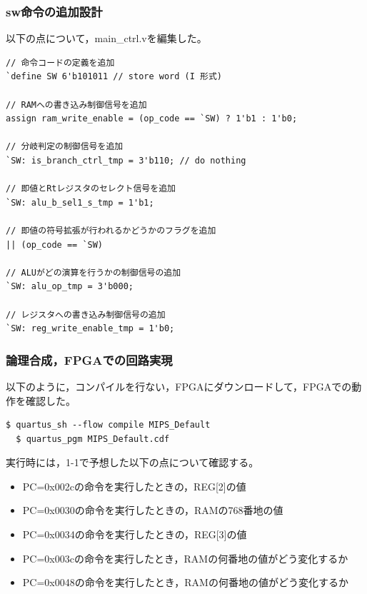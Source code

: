 \subsubsection{sw命令の追加設計}
以下の点について，main\_ctrl.vを編集した。
\begin{lstlisting}[caption={sw命令の追加設計},label={sw命令の追加設計}]
// 命令コードの定義を追加
`define SW 6'b101011 // store word (I 形式)

// RAMへの書き込み制御信号を追加
assign ram_write_enable = (op_code == `SW) ? 1'b1 : 1'b0;

// 分岐判定の制御信号を追加
`SW: is_branch_ctrl_tmp = 3'b110; // do nothing

// 即値とRtレジスタのセレクト信号を追加
`SW: alu_b_sel1_s_tmp = 1'b1;

// 即値の符号拡張が行われるかどうかのフラグを追加
|| (op_code == `SW)

// ALUがどの演算を行うかの制御信号の追加
`SW: alu_op_tmp = 3'b000;

// レジスタへの書き込み制御信号の追加
`SW: reg_write_enable_tmp = 1'b0;

\end{lstlisting}

\subsubsection{論理合成，FPGAでの回路実現}
以下のように，コンパイルを行ない，FPGAにダウンロードして，FPGAでの動作を確認した。

\begin{lstlisting}[caption={コンパイル，ダウンロード},label={コンパイル，ダウンロード1-2}]
  $ quartus_sh --flow compile MIPS_Default
  $ quartus_pgm MIPS_Default.cdf 
\end{lstlisting}

実行時には，1-1で予想した以下の点について確認する。
\begin{itemize}
  \item PC=0x002cの命令を実行したときの，REG[2]の値
  \item PC=0x0030の命令を実行したときの，RAMの768番地の値
  \item PC=0x0034の命令を実行したときの，REG[3]の値
  \item PC=0x003cの命令を実行したとき，RAMの何番地の値がどう変化するか
  \item PC=0x0048の命令を実行したとき，RAMの何番地の値がどう変化するか
\end{itemize}

